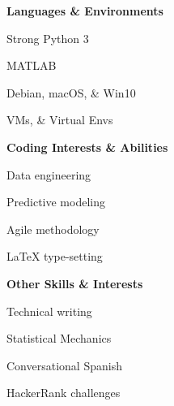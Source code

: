 \documentclass[letterpaper,final]{memoir}
\newcommand{\LargeSep}{\vspace{1.3em}}
\newcommand{\Sep}{\vspace{1.0em}}
\newcommand{\SmallSep}{\vspace{0.4em}}
\newcommand{\CVItem}[1]
	{\textbf{\color{Blue} #1}}
\begin{document}
\Sep
\CVItem{Languages \& Environments}
\SmallSep

\begin{multicols}{4}

    \begin{compactitem}[\color{Blue}$\circ$]
		
		\item Strong Python 3
        \SmallSep
        
        \item MATLAB
		\SmallSep
        
        \item Debian, macOS, \& Win10
        \SmallSep

        \item VMs, \& Virtual Envs
    
	\end{compactitem}

\end{multicols}

\Sep
\CVItem{Coding Interests \& Abilities}
\SmallSep

\begin{multicols}{4}

    \begin{compactitem}[\color{Blue}$\circ$]

        \item Data engineering
        \SmallSep

        \item Predictive modeling
        \SmallSep
   
        \item Agile methodology
        \SmallSep

        \item LaTeX type-setting
        
	\end{compactitem}

\end{multicols}

\Sep
\CVItem{Other Skills \& Interests}
\SmallSep

\begin{multicols}{4}

    \begin{compactitem}[\color{Blue}$\circ$] 

        \item Technical writing
        \SmallSep

        \item Statistical Mechanics
        \SmallSep
    
        \item Conversational Spanish
        \SmallSep 

		\item HackerRank challenges    
	\end{compactitem}
\end{multicols}
\LargeSep
\end{document}
